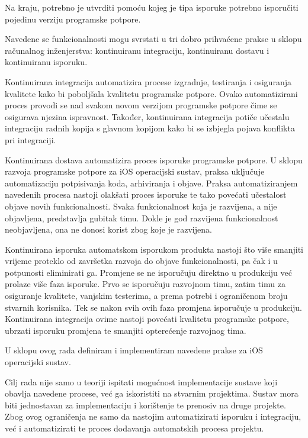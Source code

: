 \documentclass[times, utf8, diplomski, numeric]{fer}
\begin{document}
Na kraju, potrebno je utvrditi pomoću kojeg je tipa isporuke potrebno isporučiti pojedinu verziju programske potpore.

Navedene se funkcionalnosti mogu svrstati u tri dobro prihvaćene prakse u sklopu računalnog inženjerstva: kontinuiranu integraciju, kontinuiranu dostavu i kontinuiranu isporuku.

Kontinuirana integracija automatizira procese izgradnje, testiranja i osiguranja kvalitete kako bi poboljšala kvalitetu programske potpore. Ovako automatizirani proces provodi se nad svakom novom verzijom programske potpore čime se osigurava njezina ispravnost. Također, kontinuirana integracija potiče učestalu integraciju radnih kopija s glavnom kopijom kako bi se izbjegla pojava konflikta pri integraciji.

Kontinuirana dostava automatizira proces isporuke programske potpore. U sklopu razvoja programske potpore za iOS operacijski sustav, praksa uključuje automatizaciju potpisivanja koda, arhiviranja i objave. Praksa automatiziranjem navedenih procesa nastoji olakšati proces isporuke te tako povećati učestalost objave novih funkcionalnosti. Svaka funkcionalnost koja je razvijena, a nije objavljena, predstavlja gubitak timu. Dokle je god razvijena funkcionalnost neobjavljena, ona ne donosi korist zbog koje je razvijena.

Kontinuirana isporuka automatskom isporukom produkta nastoji što više smanjiti vrijeme proteklo od završetka razvoja do objave funkcionalnosti, pa čak i u potpunosti eliminirati ga. Promjene se ne isporučuju direktno u produkciju već prolaze više faza isporuke. Prvo se isporučuju razvojnom timu, zatim timu za osiguranje kvalitete, vanjskim testerima, a prema potrebi i ograničenom broju stvarnih korisnika. Tek se nakon svih ovih faza promjena isporučuje u produkciju. Kontinuirana integracija ovime nastoji povećati kvalitetu programske potpore, ubrzati isporuku promjena te smanjiti opterećenje razvojnog tima.

U sklopu ovog rada definiram i implementiram navedene prakse za iOS operacijski sustav.

Cilj rada nije samo u teoriji ispitati mogućnost implementacije sustave koji obavlja navedene procese, već ga iskoristiti na stvarnim projektima. Sustav mora biti jednostavan za implementaciju i korištenje te prenosiv na druge projekte. Zbog ovog ograničenja ne samo da nastojim automatizirati isporuku i integraciju, već i automatizirati te proces dodavanja automatskih procesa projektu.
\end{document}
